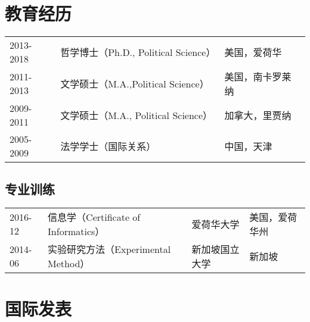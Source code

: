 \documentclass[
  12pt,
]
{article}
\begin{document}
\hypertarget{ux6559ux80b2ux7ecfux5386}{%
\section{教育经历}\label{ux6559ux80b2ux7ecfux5386}}

\begin{table}[!h]
\centering
\begin{tabular}{l>{\raggedright\arraybackslash}p{30em}>{\raggedright\arraybackslash}p{10em}}

2013-2018 & 哲学博士（Ph.D., Political Science） & 美国，爱荷华\\
2011-2013 & 文学硕士（M.A.,Political Science） & 美国，南卡罗莱纳\\
2009-2011 & 文学硕士（M.A., Political Science） & 加拿大，里贾纳\\
2005-2009 & 法学学士（国际关系） & 中国，天津\\

\end{tabular}
\end{table}

\hypertarget{ux4e13ux4e1aux8badux7ec3}{%
\subsection{专业训练}\label{ux4e13ux4e1aux8badux7ec3}}

\begin{table}[!h]
\centering
\begin{tabular}{l>{\raggedright\arraybackslash}p{20em}>{\raggedright\arraybackslash}p{10em}>{\raggedright\arraybackslash}p{10em}}

2016-12 & 信息学（Certificate of Informatics） & 爱荷华大学 & 美国，爱荷华州\\
2014-06 & 实验研究方法（Experimental Method） & 新加坡国立大学 & 新加坡\\

\end{tabular}
\end{table}

\hypertarget{ux56fdux9645ux53d1ux8868}{%
\section{国际发表}\label{ux56fdux9645ux53d1ux8868}}
\end{document}
